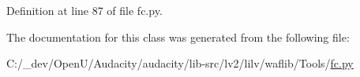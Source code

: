 Definition at line 87 of file fc.\+py.



The documentation for this class was generated from the following file\+:\begin{DoxyCompactItemize}
\item 
C\+:/\+\_\+dev/\+Open\+U/\+Audacity/audacity/lib-\/src/lv2/lilv/waflib/\+Tools/\hyperlink{lilv_2waflib_2_tools_2fc_8py}{fc.\+py}\end{DoxyCompactItemize}
